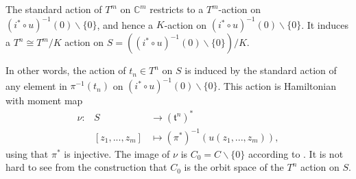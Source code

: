 \documentclass[12pt]{amsart}
\theoremstyle{definition}
\numberwithin{equation}{section}
\begin{document}
The standard action of $T^m$ on ${{\mathbb{C}}}^m$ restricts to a $T^m$-action
on $(i^{*}\circ u)^{-1}(0)\backslash \{0\}$, and hence a $K$-action
on $(i^{*}\circ u)^{-1}(0)\backslash \{0\}$. It induces a $T^n\cong
T^m/K$ action on $S=((i^{*}\circ u)^{-1}(0)\backslash \{0\})/K$.

In other words, the action of $t_{n}\in T^n$ on $S$ is induced by
the standard action of any element in $\pi^{-1}(t_{n})$ on
$(i^{*}\circ u)^{-1}(0)\backslash \{0\}$. This action is Hamiltonian
with moment map
\begin{eqnarray}\label{eq:moment toric }
\nu: & S& \rightarrow  (\mathfrak{t}^n)^{*}\\
&[z_{1},...,z_{m}]& \mapsto (\pi^{*})^{-1}(u(z_{1},...,z_{m})),
\end{eqnarray}
using that $\pi^{*}$ is injective. The image of $\nu$ is
$C_{0}=C\backslash\{0\}$ according to \cite{L:contact toric}. It is
not hard to see from the construction that $C_{0}$ is the orbit
space of the $T^n$ action on $S$.
\end{document}
